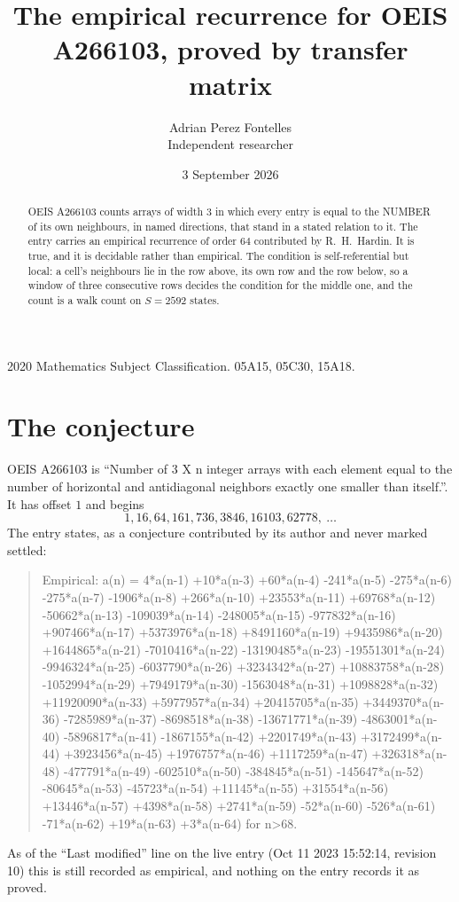 \documentclass[11pt,a4paper]{article}
\title{The empirical recurrence for OEIS A266103, proved by transfer matrix}
\author{Adrian Perez Fontelles\\ \small Independent researcher}
\date{3 September 2026}
\theoremstyle{plain}
\theoremstyle{definition}
\begin{document}
\maketitle

\begin{abstract}
OEIS A266103 counts arrays of width $3$ in which every entry is equal to the NUMBER of its own
neighbours, in named directions, that stand in a stated relation to it. The entry carries an
empirical recurrence of order $64$ contributed by R.~H.~Hardin. It is true, and it is
decidable rather than empirical. The condition is self-referential but local: a cell's
neighbours lie in the row above, its own row and the row below, so a window of three
consecutive rows decides the condition for the middle one, and the count is a walk count on
$S=2592$ states.
\end{abstract}

\noindent\small 2020 Mathematics Subject Classification. 05A15, 05C30, 15A18.\normalsize

\section{The conjecture}

OEIS A266103 is ``Number of 3 X n integer arrays with each element equal to the number of horizontal and antidiagonal neighbors exactly one smaller than itself.''. It has offset $1$ and begins
\[
1, 16, 64, 161, 736, 3846, 16103, 62778,\ \dots
\]
The entry states, as a conjecture contributed by its author and never marked settled:
\begin{quote}
Empirical: a(n) = 4*a(n-1) +10*a(n-3) +60*a(n-4) -241*a(n-5) -275*a(n-6) -275*a(n-7) -1906*a(n-8) +266*a(n-10) +23553*a(n-11) +69768*a(n-12) -50662*a(n-13) -109039*a(n-14) -248005*a(n-15) -977832*a(n-16) +907466*a(n-17) +5373976*a(n-18) +8491160*a(n-19) +9435986*a(n-20) +1644865*a(n-21) -7010416*a(n-22) -13190485*a(n-23) -19551301*a(n-24) -9946324*a(n-25) -6037790*a(n-26) +3234342*a(n-27) +10883758*a(n-28) -1052994*a(n-29) +7949179*a(n-30) -1563048*a(n-31) +1098828*a(n-32) +11920090*a(n-33) +5977957*a(n-34) +20415705*a(n-35) +3449370*a(n-36) -7285989*a(n-37) -8698518*a(n-38) -13671771*a(n-39) -4863001*a(n-40) -5896817*a(n-41) -1867155*a(n-42) +2201749*a(n-43) +3172499*a(n-44) +3923456*a(n-45) +1976757*a(n-46) +1117259*a(n-47) +326318*a(n-48) -477791*a(n-49) -602510*a(n-50) -384845*a(n-51) -145647*a(n-52) -80645*a(n-53) -45723*a(n-54) +11145*a(n-55) +31554*a(n-56) +13446*a(n-57) +4398*a(n-58) +2741*a(n-59) -52*a(n-60) -526*a(n-61) -71*a(n-62) +19*a(n-63) +3*a(n-64) for n>68.
\end{quote}
As of the ``Last modified'' line on the live entry (Oct 11 2023 15:52:14, revision 10) this is still
recorded as empirical, and nothing on the entry records it as proved.
\end{document}
